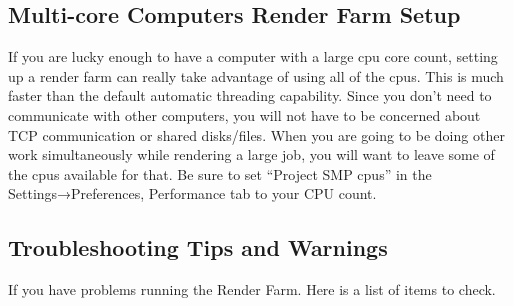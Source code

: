 \subsection{Multi-core Computers Render Farm Setup}%
\label{sub:multi_core_render_farm_setup}

If you are lucky enough to have a computer with a large cpu core count, setting up a render farm
can really take advantage of using all of the cpus. This is much faster than the default automatic
threading capability. Since you don’t need to communicate with other computers, you will not have
to be concerned about TCP communication or shared disks/files. When you are going to be doing other
work simultaneously while rendering a large job, you will want to leave some of the cpus available
for that.  Be sure to set “Project SMP cpus” in the Settings→Preferences, Performance tab to your
CPU count.

\subsection{Troubleshooting Tips and Warnings}%
\label{sub:troubleshhoting_tips_warnings}

\noindent If you have problems running the Render Farm.  Here is a list of items to check.

